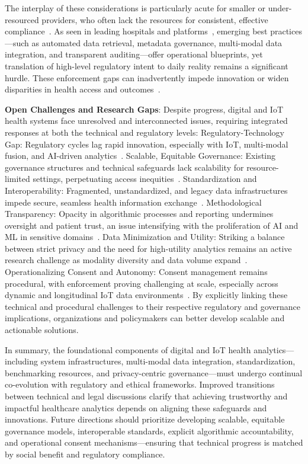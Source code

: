 \documentclass[sigconf]{acmart}
\begin{document}
The interplay of these considerations is particularly acute for smaller or under-resourced providers, who often lack the resources for consistent, effective compliance~\cite{ref82,ref84,ref106}. As seen in leading hospitals and platforms~\cite{ref84,ref82}, emerging best practices—such as automated data retrieval, metadata governance, multi-modal data integration, and transparent auditing—offer operational blueprints, yet translation of high-level regulatory intent to daily reality remains a significant hurdle. These enforcement gaps can inadvertently impede innovation or widen disparities in health access and outcomes~\cite{ref82,ref84,ref106}.

\textbf{Open Challenges and Research Gaps}: Despite progress, digital and IoT health systems face unresolved and interconnected issues, requiring integrated responses at both the technical and regulatory levels:
Regulatory-Technology Gap: Regulatory cycles lag rapid innovation, especially with IoT, multi-modal fusion, and AI-driven analytics~\cite{ref83,ref84,ref90}.
Scalable, Equitable Governance: Existing governance structures and technical safeguards lack scalability for resource-limited settings, perpetuating access inequities~\cite{ref82,ref84,ref106}.
Standardization and Interoperability: Fragmented, unstandardized, and legacy data infrastructures impede secure, seamless health information exchange~\cite{ref82,ref83,ref84,ref51}.
Methodological Transparency: Opacity in algorithmic processes and reporting undermines oversight and patient trust, an issue intensifying with the proliferation of AI and ML in sensitive domains~\cite{ref70,ref51,ref83,ref84}.
Data Minimization and Utility: Striking a balance between strict privacy and the need for high-utility analytics remains an active research challenge as modality diversity and data volume expand~\cite{ref90,ref83}.
Operationalizing Consent and Autonomy: Consent management remains procedural, with enforcement proving challenging at scale, especially across dynamic and longitudinal IoT data environments~\cite{ref84}.
By explicitly linking these technical and procedural challenges to their respective regulatory and governance implications, organizations and policymakers can better develop scalable and actionable solutions.

In summary, the foundational components of digital and IoT health analytics—including system infrastructures, multi-modal data integration, standardization, benchmarking resources, and privacy-centric governance—must undergo continual co-evolution with regulatory and ethical frameworks. Improved transitions between technical and legal discussions clarify that achieving trustworthy and impactful healthcare analytics depends on aligning these safeguards and innovations. Future directions should prioritize developing scalable, equitable governance models, interoperable standards, explicit algorithmic accountability, and operational consent mechanisms—ensuring that technical progress is matched by social benefit and regulatory compliance.
\end{document}
